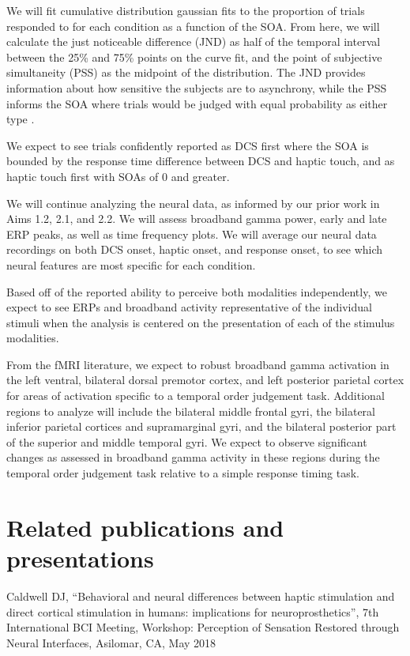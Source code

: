 We will fit cumulative distribution gaussian fits to the proportion of trials responded to for each condition as a function of the SOA. From here, we will calculate the just noticeable difference (JND) as half of the temporal interval between the 25\% and 75\% points on the curve fit, and the point of subjective simultaneity (PSS) as the midpoint of the distribution. The JND provides information about how sensitive the subjects are to asynchrony, while the PSS informs the SOA where trials would be judged with equal probability as either type \cite{Miyazaki2016}. 

We expect to see trials confidently reported as DCS first where the SOA is bounded by the response time difference between DCS and haptic touch, and as haptic touch first with SOAs of 0 and greater. 

We will continue analyzing the neural data, as informed by our prior work in Aims 1.2, 2.1, and 2.2. We will assess broadband gamma power, early and late ERP peaks, as well as time frequency plots. We will average our neural data recordings on both DCS onset, haptic onset, and response onset, to see which neural features are most specific for each condition. 

Based off of the reported ability to perceive both modalities independently, we expect to see ERPs and broadband activity representative of the individual stimuli when the analysis is centered on the presentation of each of the stimulus modalities. 

From the fMRI literature, we expect to robust broadband gamma activation in the left ventral, bilateral dorsal premotor cortex, and left posterior parietal cortex for areas of activation specific to a temporal order judgement task. Additional regions to analyze will include the bilateral middle frontal gyri, the bilateral inferior parietal cortices and supramarginal gyri, and the bilateral posterior part of the superior and middle temporal gyri. We expect to observe significant changes as assessed in broadband gamma activity in these regions during the temporal order judgement task relative to a simple response timing task. 

\section{Related publications and presentations}

Caldwell DJ, “Behavioral and neural differences between haptic stimulation and direct cortical stimulation in humans: implications for neuroprosthetics”, 7th International BCI Meeting, Workshop: Perception of Sensation Restored through Neural Interfaces, Asilomar, CA, May 2018



